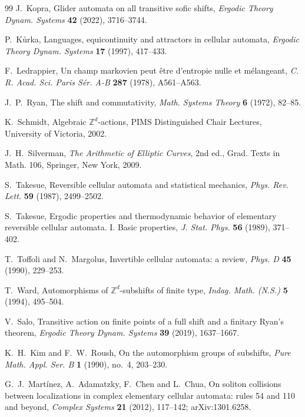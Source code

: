\begin{thebibliography}{99}
 J.~Kopra, Glider automata on all transitive sofic shifts, \emph{Ergodic Theory Dynam. Systems} \textbf{42} (2022), 3716--3744.

 P.~K\r{u}rka, Languages, equicontinuity and attractors in cellular automata, \emph{Ergodic Theory Dynam. Systems} \textbf{17} (1997), 417--433.

 F.~Ledrappier, Un champ markovien peut \^etre d'entropie nulle et m\'elangeant, \emph{C. R. Acad. Sci. Paris S\'er. A-B} \textbf{287} (1978), A561--A563.

 J.~P.~Ryan, The shift and commutativity, \emph{Math. Systems Theory} \textbf{6} (1972), 82--85.

 K.~Schmidt, Algebraic $\mathbb{Z}^d$-actions, PIMS Distinguished Chair Lectures, University of Victoria, 2002.

 J.~H.~Silverman, \emph{The Arithmetic of Elliptic Curves}, 2nd ed., Grad. Texts in Math. 106, Springer, New York, 2009.

 S.~Takesue, Reversible cellular automata and statistical mechanics, \emph{Phys. Rev. Lett.} \textbf{59} (1987), 2499--2502.

 S.~Takesue, Ergodic properties and thermodynamic behavior of elementary reversible cellular automata. I. Basic properties, \emph{J. Stat. Phys.} \textbf{56} (1989), 371--402.

 T.~Toffoli and N.~Margolus, Invertible cellular automata: a review, \emph{Phys. D} \textbf{45} (1990), 229--253.

 T.~Ward, Automorphisms of $\mathbb{Z}^d$-subshifts of finite type, \emph{Indag. Math. (N.S.)} \textbf{5} (1994), 495--504.

 V.~Salo, Transitive action on finite points of a full shift and a finitary Ryan's theorem, \emph{Ergodic Theory Dynam. Systems} \textbf{39} (2019), 1637--1667.

 K.~H.~Kim and F.~W.~Roush, On the automorphism groups of subshifts, \emph{Pure Math. Appl. Ser. B} \textbf{1} (1990), no.~4, 203--230.

 G.~J.~Mart\'inez, A.~Adamatzky, F.~Chen and L.~Chua, On soliton collisions between localizations in complex elementary cellular automata: rules 54 and 110 and beyond, \emph{Complex Systems} \textbf{21} (2012), 117--142; arXiv:1301.6258.


\end{thebibliography}
